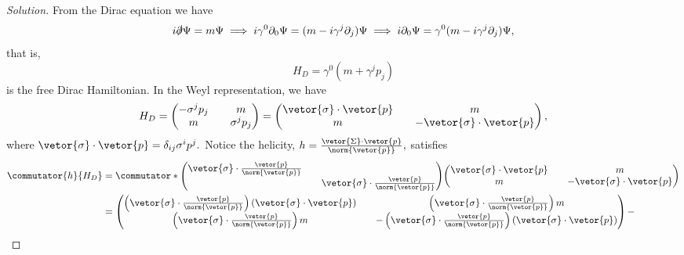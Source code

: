 \begin{proof}[Solution]
   From the Dirac equation we have
   \begin{equation*}
      i\slashed{\partial}\Psi = m \Psi \implies i \gamma^0\partial_0 \Psi = (m - i \gamma^j \partial_j)\Psi \implies i \partial_0 \Psi = \gamma^0 (m - i \gamma^j \partial_j) \Psi,
   \end{equation*}
   that is, 
   \begin{equation*}
      H_D = \gamma^0 (m + \gamma^j p_j)
   \end{equation*}
   is the free Dirac Hamiltonian. In the Weyl representation, we have
   \begin{equation*}
      H_D = \begin{pmatrix}
         -\sigma^j p_j && m\\
         m && \sigma^j p_j
         \end{pmatrix} = \begin{pmatrix}
         \vetor{\sigma} \cdot \vetor{p} && m\\
         m && -\vetor{\sigma} \cdot \vetor{p}
      \end{pmatrix},
   \end{equation*}
   where \(\vetor{\sigma} \cdot \vetor{p} = \delta_{ij} \sigma^i p^j.\) Notice the helicity, \(h = \frac{\vetor{\Sigma} \cdot \vetor{p}}{\norm{\vetor{p}}},\) satisfies
   \begin{align*}
      \commutator{h}{H_D} 
      &= \commutator*{\begin{pmatrix}
            \vetor{\sigma} \cdot \frac{\vetor{p}}{\norm{\vetor{p}}} &&\\
                                                                    && \vetor{\sigma} \cdot \frac{\vetor{p}}{\norm{\vetor{p}}}
      \end{pmatrix}}
      {\begin{pmatrix}
            \vetor{\sigma} \cdot \vetor{p} && m\\
            m && -\vetor{\sigma} \cdot \vetor{p}
      \end{pmatrix}}\\
      &=
      \begin{pmatrix}
         \left(\vetor{\sigma}\cdot\frac{\vetor{p}}{\norm{\vetor{p}}}\right)(\vetor{\sigma}\cdot \vetor{p}) && \left(\vetor{\sigma}\cdot\frac{\vetor{p}}{\norm{\vetor{p}}}\right)m\\
         \left(\vetor{\sigma}\cdot\frac{\vetor{p}}{\norm{\vetor{p}}}\right)m && -\left(\vetor{\sigma}\cdot\frac{\vetor{p}}{\norm{\vetor{p}}}\right)(\vetor{\sigma} \cdot \vetor{p})
      \end{pmatrix}-

\end{align*}
\end{proof}
